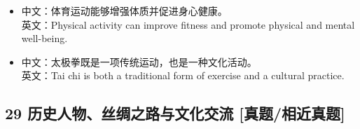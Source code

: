 \documentclass[a4paper,11pt,UTF8,fontset=none]{ctexart}
\begin{document}
\par

\begin{itemize}[leftmargin=1.7em,itemsep=1pt,parsep=0pt,topsep=2pt]
\item \noindent 中文：体育运动能够增强体质并促进身心健康。\\ 英文：Physical activity can improve fitness and promote physical and mental well-being.\par


\item \noindent 中文：太极拳既是一项传统运动，也是一种文化活动。\\ 英文：Tai chi is both a traditional form of exercise and a cultural practice.\par


\end{itemize}

\subsection{29 历史人物、丝绸之路与文化交流 {\color{AccentBlue} [真题/相近真题]}}
\end{document}

